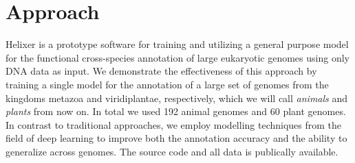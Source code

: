 \documentclass{bioinfo}
\begin{document}
\section{Approach}
Helixer is a prototype software for training and utilizing a general purpose model for the functional cross-species annotation of large eukaryotic genomes using only DNA data as input. We demonstrate the effectiveness of this approach by training a single model for the annotation of a large set of genomes from the kingdoms metazoa and viridiplantae, respectively, which we will call {\it animals} and {\it plants} from now on. In total we used 192 animal genomes and 60 plant genomes. In contrast to traditional approaches, we employ modelling techniques from the field of deep learning to improve both the annotation accuracy and the ability to generalize across genomes. The source code and all data is publically available.
\end{document}
